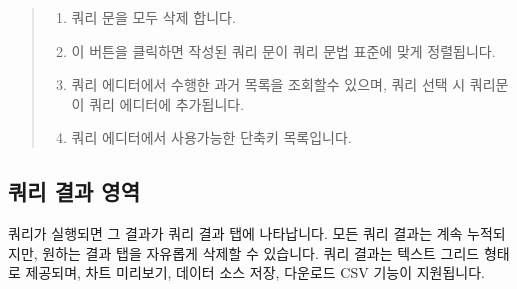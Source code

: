 \documentclass[letterpaper,10pt,english]{sphinxmanual}
\begin{document}
\begin{quote}
\begin{enumerate}
\item {} 
 쿼리 문을 모두 삭제 합니다.

\item {} 
 이 버튼을 클릭하면 작성된 쿼리 문이 쿼리 문법 표준에 맞게 정렬됩니다.

\item {} 
 쿼리 에디터에서 수행한 과거 목록을 조회할수 있으며, 쿼리 선택 시 쿼리문이 쿼리 에디터에 추가됩니다.

\item {} 
 쿼리 에디터에서 사용가능한 단축키 목록입니다.

\end{enumerate}
\end{quote}


\subsection{쿼리 결과 영역}
\label{\detokenize{discovery/part06/06_03-use_a_workbench:workbench-use-4}}\label{\detokenize{discovery/part06/06_03-use_a_workbench:id5}}
쿼리가 실행되면 그 결과가 쿼리 결과 탭에 나타납니다. 모든 쿼리 결과는 계속 누적되지만, 원하는 결과 탭을 자유롭게 삭제할 수 있습니다. 쿼리 결과는 텍스트 그리드 형태로 제공되며, 차트 미리보기, 데이터 소스 저장, 다운로드 CSV 기능이 지원됩니다.
\end{document}
